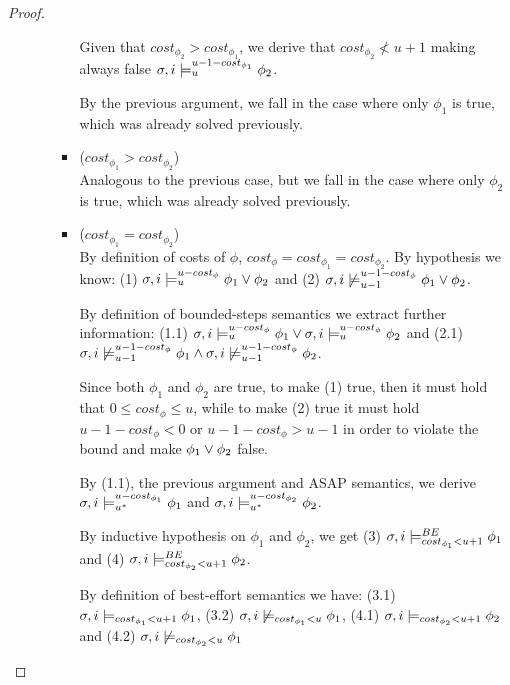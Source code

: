 \begin{theorem}
\begin{proof}
\begin{itemize}
\begin{itemize}
\begin{itemize}
             Given that $cost_{\phi_2} > cost_{\phi_1}$, we derive that $cost_{\phi_2} \not< u + 1$ making always false $\sigma,i \models_{u}^{u-1-cost_{\phi_1}} \phi_2$.

             By the previous argument, we fall in the case where only $\phi_1$ is true, which was already solved previously.
             
            \item ($cost_{\phi_1} > cost_{\phi_2}$) \\
            Analogous to the previous case, but we fall in the case where only $\phi_2$ is true, which was already solved previously.

            \item ($cost_{\phi_1} = cost_{\phi_2}$) \\
            By definition of costs of $\phi$, $cost_\phi = cost_{\phi_1} = cost_{\phi_2}$.
            By hypothesis we know: 
            (1) $\sigma, i \models_{u}^{u-cost_\phi} \phi_1 \lor \phi_2$ and
            (2) $\sigma, i \not\models_{u-1}^{u-1-cost_\phi} \phi_1 \lor \phi_2$.
            
            By definition of bounded-steps semantics we extract further information:
            (1.1) $\sigma,i \models_{u}^{u-cost_\phi} \phi_1 \lor \sigma,i \models_{u}^{u-cost_\phi} \phi_2$ and 
            (2.1) $\sigma,i \not\models_{u-1}^{u-1-cost_\phi} \phi_1 \land \sigma,i \not\models_{u-1}^{u-1-cost_\phi} \phi_2$.

            Since both $\phi_1$ and $\phi_2$ are true, to make (1) true, then it must hold that $0 \leq cost_\phi \leq u$, while to make (2) true it must hold $u-1-cost_\phi < 0$ or $u-1-cost_\phi > u-1$ in order to violate the bound and make $\phi_1 \lor \phi_2$ false.  

            By (1.1), the previous argument and ASAP semantics, we derive $\sigma,i \models_{{u}^*}^{u-cost_{\phi_1}} \phi_1$ and $\sigma,i \models_{{u}^*}^{u-cost_{\phi_2}} \phi_2$.

            By inductive hypothesis on $\phi_1$ and $\phi_2$, we get (3) $\sigma,i \models_{cost_{\phi_1} < u + 1}^{BE} \phi_1$ and (4) $\sigma,i \models_{cost_{\phi_2} < u + 1}^{BE} \phi_2$.

            By definition of best-effort semantics we have: 
            (3.1) $\sigma,i \models_{cost_{\phi_1} < u + 1} \phi_1$,
            (3.2) $\sigma,i \not\models_{cost_{\phi_1} < u} \phi_1$,
            (4.1) $\sigma,i \models_{cost_{\phi_2} < u + 1} \phi_2$ and
            (4.2) $\sigma,i \not\models_{cost_{\phi_2} < u} \phi_1$


\end{itemize}
\end{itemize}
\end{itemize}
\end{proof}
\end{theorem}
